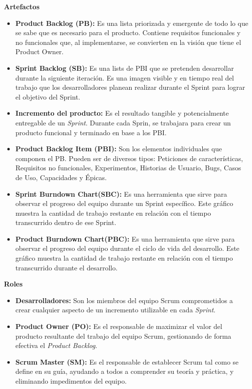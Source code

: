 \textbf{Artefactos}
\begin{itemize}
    \item \textbf{Product Backlog (PB):} Es una lista priorizada y emergente de todo lo que se sabe que es necesario para el producto. Contiene requisitos funcionales y no funcionales que, al implementarse, se convierten en la visión que tiene el Product Owner.
    \item \textbf{Sprint Backlog (SB):} Es una lists de PBI que se pretenden desarrollar durante la siguiente iteración. Es una imagen visible y en tiempo real del trabajo que los desarrolladores planean realizar durante el Sprint para lograr el objetivo del Sprint.
    \item \textbf{Incremento del producto:} Es el resultado tangible y potencialmente entregable de un \textit{Sprint}. Durante cada Sprin, se trabajara para crear un producto funcional y terminado en base a los PBI.
    \item \textbf{Product Backlog Item (PBI):} Son los elementos individuales que componen el PB. Pueden ser de diversos tipos: Peticiones de características, Requisitos no funcionales, Experimentos, Historias de Usuario, Bugs, Casos de Uso, Capacidades y Épicas.
    \item \textbf{Sprint Burndown Chart(SBC):} Es una herramienta que sirve para observar el progreso del equipo durante un Sprint específico. Este gráfico muestra la cantidad de trabajo restante en relación con el tiempo transcurrido dentro de ese Sprint.
    \item \textbf{Product Burndown Chart(PBC):} Es una herramienta que sirve para observar el progreso del equipo durante el ciclo de vida del desarrollo. Este gráfico muestra la cantidad de trabajo restante en relación con el tiempo transcurrido durante el desarrollo.
\end{itemize}

\textbf{Roles}
\begin{itemize}
    \item \textbf{Desarrolladores:} Son los miembros del equipo Scrum comprometidos a crear cualquier aspecto de un incremento utilizable en cada \textit{Sprint}.
    \item \textbf{Product Owner (PO):} Es el responsable de maximizar el valor del producto resultante del trabajo del equipo Scrum, gestionando de forma efectiva el \textit{Product Backlog}.
    \item \textbf{Scrum Master (SM):} Es el responsable de establecer Scrum tal como se define en su guía, ayudando a todos a comprender su teoría y práctica, y eliminando impedimentos del equipo.
\end{itemize}

